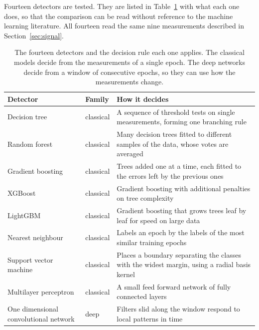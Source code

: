 \documentclass[pdflatex,sn-basic]{sn-jnl}
\theoremstyle{thmstyleone}
\theoremstyle{thmstyletwo}
\theoremstyle{thmstylethree}
\begin{document}
Fourteen detectors are tested. They are listed in Table~\ref{tab:detectors} with what
each one does, so that the comparison can be read without reference to the machine
learning literature. All fourteen read the same nine measurements described in
Section~\ref{sec:signal}.

\begin{table}[t]
\centering
\caption{The fourteen detectors and the decision rule each one applies. The classical
models decide from the measurements of a single epoch. The deep networks decide from a
window of consecutive epochs, so they can use how the measurements change.}
\label{tab:detectors}
\begin{tabular}{@{}p{3.6cm}lp{7.0cm}@{}}
\toprule
Detector & Family & How it decides \\
\midrule
Decision tree      & classical & A sequence of threshold tests on single measurements,
                                 forming one branching rule \citep{breiman2001random} \\
Random forest      & classical & Many decision trees fitted to different samples of the
                                 data, whose votes are averaged \citep{breiman2001random} \\
Gradient boosting  & classical & Trees added one at a time, each fitted to the errors
                                 left by the previous ones \citep{friedman2001greedy} \\
XGBoost            & classical & Gradient boosting with additional penalties on tree
                                 complexity \citep{chen2016xgboost} \\
LightGBM           & classical & Gradient boosting that grows trees leaf by leaf for
                                 speed on large data \citep{ke2017lightgbm} \\
Nearest neighbour  & classical & Labels an epoch by the labels of the most similar
                                 training epochs \\
Support vector machine & classical & Places a boundary separating the classes with the
                                 widest margin, using a radial basis kernel \\
Multilayer perceptron & classical & A small feed forward network of fully connected
                                 layers \\
\midrule
One dimensional convolutional network & deep & Filters slid along the window respond to
                                 local patterns in time \\

\end{tabular}
\end{table}
\end{document}
